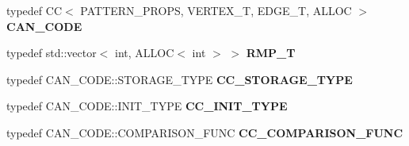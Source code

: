 \begin{CompactItemize}
\item 
typedef CC$<$ PATTERN\_\-PROPS, VERTEX\_\-T, EDGE\_\-T, ALLOC $>$ \textbf{CAN\_\-CODE}\label{classpattern_b2af67e801f2b235e763a1201e410caf}

\item 
typedef std::vector$<$ int, ALLOC$<$ int $>$ $>$ \textbf{RMP\_\-T}\label{classpattern_00e1c20461a1f83f2445cbeb7d6fcb25}

\item 
typedef CAN\_\-CODE::STORAGE\_\-TYPE \textbf{CC\_\-STORAGE\_\-TYPE}\label{classpattern_8776bbbc886f99fce409497102d0e2c1}

\item 
typedef CAN\_\-CODE::INIT\_\-TYPE \textbf{CC\_\-INIT\_\-TYPE}\label{classpattern_9dfb4fa23491b5fd7c8b918987ce1621}

\item 
typedef CAN\_\-CODE::COMPARISON\_\-FUNC \textbf{CC\_\-COMPARISON\_\-FUNC}\label{classpattern_614baff33d4079356cd4584d9b6c432d}

\end{CompactItemize}
